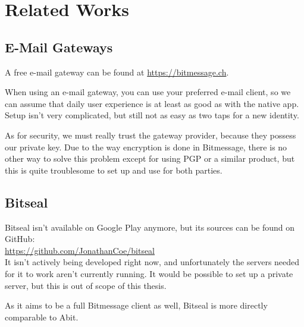 \documentclass{bfh}
\begin{document}
  \newpage
  \section{Related Works}
  \subsection{E-Mail Gateways}
  A free e-mail gateway can be found at \url{https://bitmessage.ch}.

  When using an e-mail gateway, you can use your preferred e-mail client, so we can assume that daily user experience is at least as good as with the native app. Setup isn't very complicated, but still not as easy as two taps for a new identity.

  As for security, we must really trust the gateway provider, because they possess our private key. Due to the way encryption is done in Bitmessage, there is no other way to solve this problem except for using \ac{PGP} or a similar product, but this is quite troublesome to set up and use for both parties.


  \subsection{Bitseal}
  Bitseal isn't available on Google Play anymore, but its sources can be found on GitHub:\\
  \url{https://github.com/JonathanCoe/bitseal}\\
  It isn't actively being developed right now, and unfortunately the servers needed for it to work aren't currently running. It would be possible to set up a private server, but this is out of scope of this thesis.

  As it aims to be a full Bitmessage client as well, Bitseal is more directly comparable to Abit.
\end{document}

